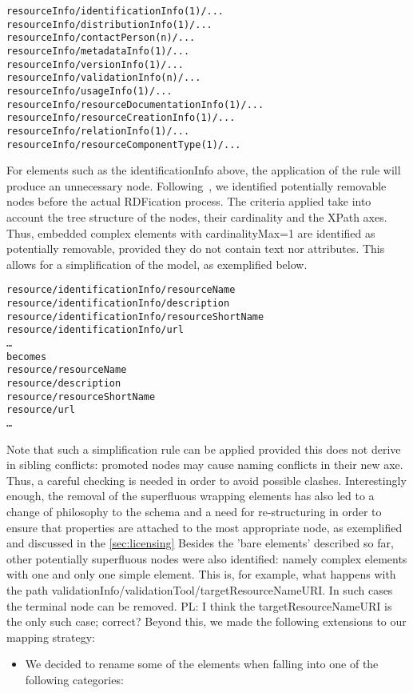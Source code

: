 \documentclass{llncs}
\begin{document}
{{\footnotesize
\begin{verbatim}
resourceInfo/identificationInfo(1)/...
resourceInfo/distributionInfo(1)/...
resourceInfo/contactPerson(n)/...
resourceInfo/metadataInfo(1)/...
resourceInfo/versionInfo(1)/...
resourceInfo/validationInfo(n)/...
resourceInfo/usageInfo(1)/...
resourceInfo/resourceDocumentationInfo(1)/...
resourceInfo/resourceCreationInfo(1)/...
resourceInfo/relationInfo(1)/...
resourceInfo/resourceComponentType(1)/...
\end{verbatim}}
For elements such as the identificationInfo above, the application of the rule will produce an unnecessary node. Following~\cite{Villegas2014}, we identified potentially removable nodes before the actual RDFication process. The criteria applied take into account the tree structure of the nodes, their cardinality and the XPath axes. Thus, embedded complex elements with cardinalityMax=1 are identified as potentially removable, provided they do not contain text nor attributes. This allows for a simplification of the model, as exemplified below.
{\footnotesize
\begin{verbatim}
resource/identificationInfo/resourceName
resource/identificationInfo/description
resource/identificationInfo/resourceShortName
resource/identificationInfo/url
…
becomes
resource/resourceName
resource/description
resource/resourceShortName
resource/url
…
\end{verbatim}}
Note that such a simplification rule can be applied provided this does not derive in sibling conflicts: promoted nodes may cause naming conflicts in their new axe. Thus, a careful checking is needed in order to avoid possible clashes.
Interestingly enough, the removal of the superfluous wrapping elements has also led to a change of philosophy to the schema and a need for re-structuring in order to ensure that properties are attached to the most appropriate node, as exemplified and discussed in the \ref{sec:licensing}
Besides the 'bare elements' described so far, other potentially superfluous nodes were also identified: namely complex elements with one and only one simple element. This is, for example, what happens with the path validationInfo/validationTool/targetResourceNameURI. In such cases the terminal node can be removed.
{PL: I think the targetResourceNameURI is the only such case; correct?}
Beyond this, we made the following extensions to our mapping strategy:
\begin{itemize}
\item We decided to rename some of the elements when falling into one of the following categories:

\end{itemize}}
\end{document}
